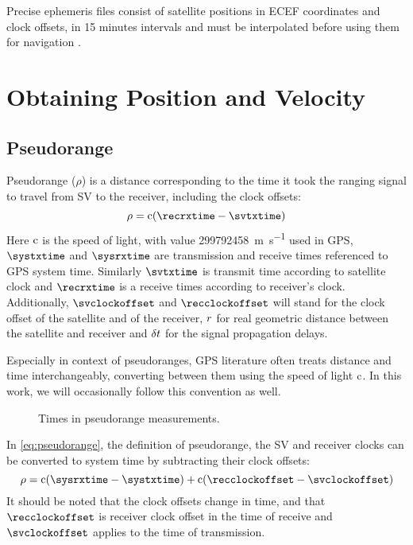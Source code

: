 Precise ephemeris files consist of satellite positions in ECEF
coordinates and clock offsets, in 15 minutes intervals and must be interpolated
before using them for navigation \cite{schenewerk03}.

\section{Obtaining Position and Velocity}


\subsection{Pseudorange}
\label{sec:pseudorange}

Pseudorange (\(\rho\)) is a distance corresponding to the time it took the ranging
signal to travel from SV to the receiver, including the clock offsets:
\begin{equation}
	\label{eq:pseudorange}
	\rho = \speedoflight (\recrxtime - \svtxtime)
\end{equation}
Here \(\mathrm{c}\) is the speed of light, with value \SI{299792458}{\meter\per\second} used in GPS,
\(\systxtime\) and \(\sysrxtime\) are transmission and receive times referenced to GPS system time.
Similarly \(\svtxtime\) is transmit time according to satellite clock and
\(\recrxtime\) is a receive times according to receiver's clock.
Additionally, \(\svclockoffset\) and \(\recclockoffset\) will stand for the clock offset of the satellite
and of the receiver, \(r\) for real geometric distance between the satellite and receiver
and \(\delta{t}\) for the signal propagation delays.

Especially in context of pseudoranges, GPS literature often treats distance and time
interchangeably, converting between them using the speed of light \(\mathrm{c}\).
In this work, we will occasionally follow this convention as well.

\begin{figure}[tb]
	\centering
	
	\caption{Times in pseudorange measurements.}
	\label{fig:pseudorange}
\end{figure}

In \eqref{eq:pseudorange}, the definition of pseudorange, the SV and receiver clocks can be
converted to system time by subtracting their clock offsets:
\begin{equation}
	\label{eq:pseudorange2}
	\rho = \speedoflight (\sysrxtime - \systxtime) + \speedoflight (\recclockoffset - \svclockoffset)
\end{equation}
It should be noted that the clock offsets change in time, and that \(\recclockoffset\) is receiver clock
offset in the time of receive and \(\svclockoffset\) applies to the time of transmission.

